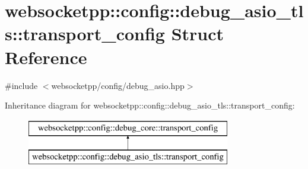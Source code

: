 \hypertarget{structwebsocketpp_1_1config_1_1debug__asio__tls_1_1transport__config}{}\section{websocketpp\+:\+:config\+:\+:debug\+\_\+asio\+\_\+tls\+:\+:transport\+\_\+config Struct Reference}
\label{structwebsocketpp_1_1config_1_1debug__asio__tls_1_1transport__config}


{\ttfamily \#include $<$websocketpp/config/debug\+\_\+asio.\+hpp$>$}

Inheritance diagram for websocketpp\+:\+:config\+:\+:debug\+\_\+asio\+\_\+tls\+:\+:transport\+\_\+config\+:\begin{figure}[H]
\begin{center}
\leavevmode
\includegraphics[height=2.000000cm]{structwebsocketpp_1_1config_1_1debug__asio__tls_1_1transport__config}
\end{center}
\end{figure}
